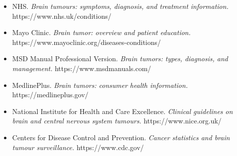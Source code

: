 \begin{itemize}
    \item NHS. \textit{Brain tumours: symptoms, diagnosis, and treatment information.} https://www.nhs.uk/conditions/
    \item Mayo Clinic. \textit{Brain tumor: overview and patient education.} https://www.mayoclinic.org/diseases-conditions/
    \item MSD Manual Professional Version. \textit{Brain tumors: types, diagnosis, and management.} https://www.msdmanuals.com/
    \item MedlinePlus. \textit{Brain tumors: consumer health information.} https://medlineplus.gov/
    \item National Institute for Health and Care Excellence. \textit{Clinical guidelines on brain and central nervous system tumours.} https://www.nice.org.uk/
    \item Centers for Disease Control and Prevention. \textit{Cancer statistics and brain tumour surveillance.} https://www.cdc.gov/
\end{itemize}
